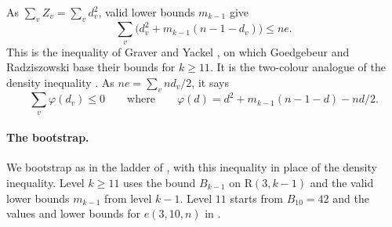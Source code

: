 \documentclass[11pt]{article}
\theoremstyle{spacedplain}
\theoremstyle{spaceddef}
\theoremstyle{spacedremark}
\newcommand{\R}{\mathrm{R}}
\begin{document}
As $\sum_vZ_v=\sum_vd_v^2$, valid lower bounds $m_{k-1}$ give
\[
\sum_v\big(d_v^2+m_{k-1}(n-1-d_v)\big)\le ne .
\]
This is the inequality of Graver and Yackel \cite{GrY}, on which Goedgebeur and Radziszowski \cite{GR13} base their bounds for $k\ge 11$.
It is the two-colour analogue of the density inequality \cite[Lemma~3.3]{DC26}.
As $ne=\sum_vnd_v/2$, it says
\[
\sum_v\varphi(d_v)\le 0 \qquad\text{where}\qquad \varphi(d)=d^2+m_{k-1}(n-1-d)-nd/2 .
\]

\paragraph{The bootstrap.}
We bootstrap as in the ladder of \cite[Section~5]{DC26}, with this inequality in place of the density inequality.
Level $k\ge 11$ uses the bound $B_{k-1}$ on $\R(3,k-1)$ and the valid lower bounds $m_{k-1}$ from level $k-1$.
Level $11$ starts from $B_{10}=42$ \cite[Theorem~6]{GR13} and the values and lower bounds for $e(3,10,n)$ in \cite{GR13}.
\end{document}
